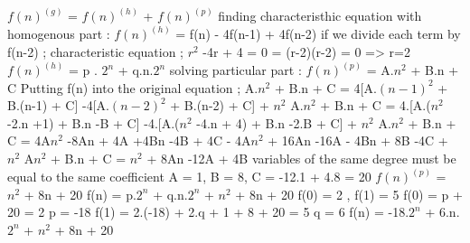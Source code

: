 \documentclass[a4 paper]{article}
\numberwithin{equation}{section}
\newcommand{\0}{\mathbf{0}}
\begin{document}
\newline
\newline
$f(n)^{(g)}$ = $f(n)^{(h)}$ + $f(n)^{(p)}$
\newline 
\newline
finding characteristhic equation with homogenous part : 
\newline
\newline
$f(n)^{(h)}$ = f(n) - 4f(n-1) + 4f(n-2)
\newline
\newline
if we divide each term by f(n-2) ;
\newline
characteristic equation ;
\newline
$r^2$ -4r + 4 = 0
\newline
=\> (r-2)(r-2) = 0      => r=2
\newline
\newline
$f(n)^{(h)}$ = p . $2^n$ + q.n.$2^n$
\newline
\newline
solving particular part :
\newline
\newline
 $f(n)^{(p)}$ = A.$n^2$ + B.n + C
\newline
\newline
Putting f(n) into the original equation ;
\newline
\newline
A.$n^2$ + B.n + C = 4[A.$(n-1)^2$ + B.(n-1) + C] -4[A.$(n-2)^2$ + B.(n-2) + C] + $n^2$
\newline
\newline
A.$n^2$ + B.n + C = 4.[A.($n^2$ -2.n +1) + B.n -B + C] -4.[A.($n^2$ -4.n + 4) + B.n -2.B + C] + $n^2$
\newline
\newline
A.$n^2$ + B.n + C = 4A$n^2$ -8An + 4A +4Bn -4B + 4C - 4A$n^2$ + 16An -16A - 4Bn + 8B -4C + $n^2$
\newline
\newline
A$n^2$ + B.n + C = $n^2$ + 8An -12A + 4B
\newline
\newline
variables of the same degree must be equal to the same coefficient
\newline
\newline
A = 1, B = 8, C = -12.1 + 4.8 = 20
\newline
\newline
$f(n)^{(p)}$ = $n^2$ + 8n + 20
\newline
\newline
f(n) = p.$2^n$ + q.n.$2^n$ + $n^2$ + 8n + 20
\newline
\newline
f(0) = 2 , f(1) = 5
\newline
\newline
f(0) = p + 20 = 2
\newline
p = -18
\newline
\newline
f(1) = 2.(-18) + 2.q + 1 + 8 + 20 = 5
\newline
\newline
q = 6
\newline
\newline
f(n) = -18.$2^n$ + 6.n.$2^n$ + $n^2$ + 8n + 20
\end{document}
